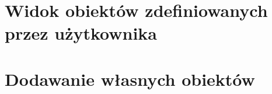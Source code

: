 \newpage
\section{Widok obiektów zdefiniowanych przez użytkownika}
\label{sec:customObjects}

\newpage
\section{Dodawanie własnych obiektów}
\label{sec:addedCustomObjects}
